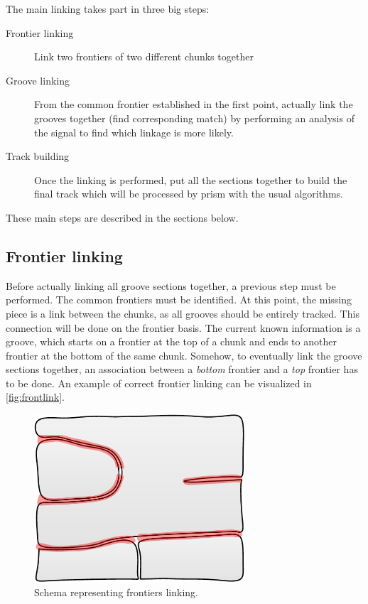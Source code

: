 The main linking takes part in three big steps:

\begin{description}
\item[Frontier linking] Link two frontiers of two different chunks together
\item[Groove linking] From the common frontier established in the first point, actually link the grooves together (find corresponding match) by performing an analysis of the signal to find which linkage is more likely.
\item[Track building] Once the linking is performed, put all the sections together to build the final track which will be processed by \gls{prism} with the usual algorithms.
\end{description}

These main steps are described in the sections below.

\subsection{Frontier linking}

Before actually linking all groove sections together, a previous step must be performed. The common frontiers must be identified. At this point, the missing piece is a link between the chunks, as all grooves should be entirely tracked. This connection will be done on the frontier basis. The current known information is a groove, which starts on a frontier at the top of a chunk and ends to another frontier at the bottom of the same chunk. Somehow, to eventually link the groove sections together, an association between a \emph{bottom} frontier and a \emph{top} frontier has to be done. An example of correct frontier linking can be visualized in \autoref{fig:frontlink}.

\begin{figure}[!ht]
\centering
\includegraphics[width=0.7\textwidth]{images/frontiers-linking}
\caption{Schema representing frontiers linking.}
\label{fig:frontlink}
\end{figure}

